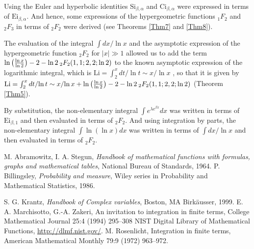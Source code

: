 \documentclass[smallextended]{svjour3}
\begin{document}
Using the Euler and hyperbolic identities $\text{Si}_{\beta,\alpha}$ and $\text{Ci}_{\beta,\alpha}$ were expressed in terms of $\text{Ei}_{\beta,\alpha}$. And hence, some expressions of the hypergeometric functions ${}_1F_2$ and ${}_2F_3$ in terms of ${}_2F_2$ were derived (see Theorems \ref{Thm7} and  \ref{Thm8}).

The evaluation of the integral $\int dx/\ln{x}$ and the asymptotic expression of the hypergeometric function ${}_2F_2$ for $|x|\gg1$ allowed us to add the term $\ln{\left(\frac{\ln{x}}{\ln{2}}\right)}-2-\ln{2}\hspace{.075cm} _{2}F_{2}(1,1;2,2;\ln{2})$ to the known asymptotic expression of the logarithmic integral, which is $\text{Li}=\int_{2}^{x} dt/\ln{t}\sim {x}/{\ln{x}}$ \cite{AS,ND}, so that it is given by $\text{Li}=\int_{2}^{x}{dt}/{\ln{t}}\sim {x}/{\ln{x}}+\ln{\left(\frac{\ln{x}}{\ln{2}}\right)}-2-
\ln{2}\hspace{.075cm} _{2}F_{2}(1,1;2,2;\ln{2})$ (Theorem \ref{Thm5}).

By substitution, the non-elementary integral $\int e^{\lambda e^ {\beta x}}dx$ was written in terms of $\text{Ei}_{\beta,1}$ and then evaluated in terms of $_{2}F_{2}$. And using integration by parts, the non-elementary integral $\int \ln(\ln{x}) dx$ was written in terms of $\int dx/\ln{x}$ and then evaluated in terms of $_{2}F_{2}$.

\begin{thebibliography}{99}

  M. Abramowitz, I. A. Stegun, \textit{Handbook of mathematical functions with formulas, graphs and mathematical tables}, National Bureau  of Standards, 1964.
  P. Billingsley, \textit{Probability and measure}, Wiley series in Probability and Mathematical Statistics, 1986.

  S. G. Krantz, \textit{Handbook of Complex variables}, Boston, MA Birk\"{au}sser, 1999.
 E. A. Marchisotto, G.-A. Zakeri, An invitation to integration in finite terms, College Mathematical Journal 25:4 (1994) 295--308
  NIST Digital Library of Mathematical Functions, \url{http://dlmf.nist.gov/}.
  M. Rosenlicht, Integration in finite terms, American Mathematical Monthly 79:9 (1972) 963--972.
\end{thebibliography}
\end{document}
